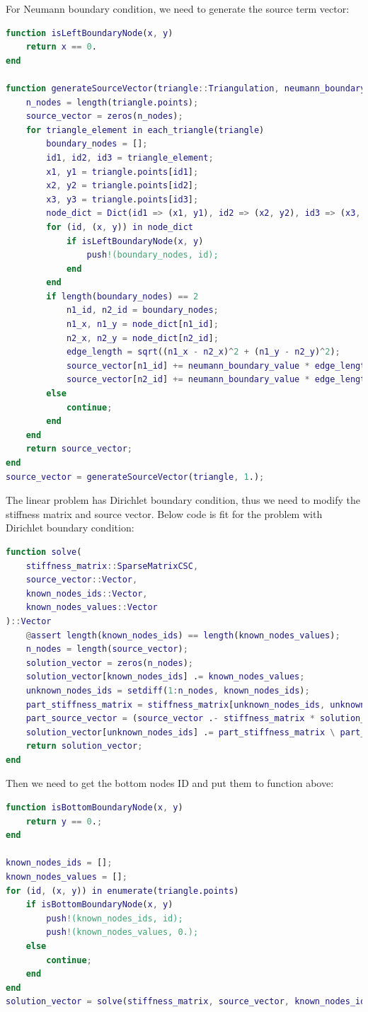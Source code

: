 For Neumann boundary condition, 
we need to generate the source term vector:
\begin{lstlisting}[language=matlab]
function isLeftBoundaryNode(x, y)
    return x == 0.
end

function generateSourceVector(triangle::Triangulation, neumann_boundary_value::Float64)
    n_nodes = length(triangle.points);
    source_vector = zeros(n_nodes);
    for triangle_element in each_triangle(triangle)
        boundary_nodes = [];
        id1, id2, id3 = triangle_element;
        x1, y1 = triangle.points[id1];
        x2, y2 = triangle.points[id2];
        x3, y3 = triangle.points[id3];
        node_dict = Dict(id1 => (x1, y1), id2 => (x2, y2), id3 => (x3, y3));
        for (id, (x, y)) in node_dict
            if isLeftBoundaryNode(x, y)
                push!(boundary_nodes, id);
            end
        end
        if length(boundary_nodes) == 2
            n1_id, n2_id = boundary_nodes;
            n1_x, n1_y = node_dict[n1_id];
            n2_x, n2_y = node_dict[n2_id];
            edge_length = sqrt((n1_x - n2_x)^2 + (n1_y - n2_y)^2);
            source_vector[n1_id] += neumann_boundary_value * edge_length / 2;
            source_vector[n2_id] += neumann_boundary_value * edge_length / 2;
        else
            continue;
        end
    end
    return source_vector;
end
source_vector = generateSourceVector(triangle, 1.);
\end{lstlisting}

The linear problem has Dirichlet boundary condition,
thus we need to modify the stiffness matrix and source vector.
Below code is fit for the problem with Dirichlet boundary condition:
\begin{lstlisting}[language=matlab]
function solve(
    stiffness_matrix::SparseMatrixCSC, 
    source_vector::Vector, 
    known_nodes_ids::Vector,
    known_nodes_values::Vector
)::Vector
    @assert length(known_nodes_ids) == length(known_nodes_values);
    n_nodes = length(source_vector);
    solution_vector = zeros(n_nodes);
    solution_vector[known_nodes_ids] .= known_nodes_values;
    unknown_nodes_ids = setdiff(1:n_nodes, known_nodes_ids);
    part_stiffness_matrix = stiffness_matrix[unknown_nodes_ids, unknown_nodes_ids];
    part_source_vector = (source_vector .- stiffness_matrix * solution_vector)[unknown_nodes_ids];
    solution_vector[unknown_nodes_ids] .= part_stiffness_matrix \ part_source_vector;
    return solution_vector;
end
\end{lstlisting}

Then we need to get the bottom nodes ID and put them to function above:
\begin{lstlisting}[language=matlab]
function isBottomBoundaryNode(x, y)
    return y == 0.;
end

known_nodes_ids = [];
known_nodes_values = [];
for (id, (x, y)) in enumerate(triangle.points)
    if isBottomBoundaryNode(x, y)
        push!(known_nodes_ids, id);
        push!(known_nodes_values, 0.);
    else
        continue;
    end
end
solution_vector = solve(stiffness_matrix, source_vector, known_nodes_ids, known_nodes_values);
\end{lstlisting}

